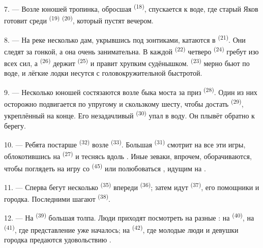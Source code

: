 7. --- Возле юношей тропинка, обросшая 
\textsuperscript{(18)}, спускается к воде, где старый Яков готовит среди
 \textsuperscript{(19)}  \textsuperscript{(20)},
который пустят вечером.

\VUsaut{4.4mm}
\VUsaut{3.4mm}

8. --- На реке несколько дам, укрывшись под зонтиками, катаются в
 \textsuperscript{(21)}. Они следят за гонкой, а она очень
занимательна. В каждой  \textsuperscript{(22)} четверо
 \textsuperscript{(24)} гребут изо всех сил, а 
\textsuperscript{(26)} держит  \textsuperscript{(25)} и правит хрупким
судёнышком.  \textsuperscript{(23)} мерно бьют по воде, и лёгкие
лодки несутся с головокружительной быстротой.

9. --- Несколько юношей состязаются возле быка моста за приз
 \textsuperscript{(28)}. Один из них осторожно
подвигается по упругому и скользкому шесту, чтобы достать
 \textsuperscript{(29)}, укреплённый на конце. Его незадачливый
 \textsuperscript{(30)} упал в воду. Он плывёт обратно к берегу.

10. --- Ребята постарше  \textsuperscript{(32)} возле
 \textsuperscript{(33)}. Большая 
\textsuperscript{(31)} смотрит на все эти игры, облокотившись на 
 \textsuperscript{(27)} и теснясь вдоль . Иные
зеваки, впрочем, оборачиваются, чтобы поглядеть на игру со
 \textsuperscript{(45)} или полюбоваться ,
идущим на .

11. --- Сперва бегут несколько  \textsuperscript{(35)} впереди
 \textsuperscript{(36)}; затем идут 
\textsuperscript{(37)}, его помощники и  городка.
Последними шагают  \textsuperscript{(38)}.

\VUsaut{5.0mm}
\VUsaut{3.6mm}

12. --- На  \textsuperscript{(39)} большая толпа.
Люди приходят посмотреть на разные : на
 \textsuperscript{(40)}, на 
\textsuperscript{(41)}, где представление уже началось; на 
\textsuperscript{(42)}, где молодые люди и девушки городка предаются
удовольствию .


